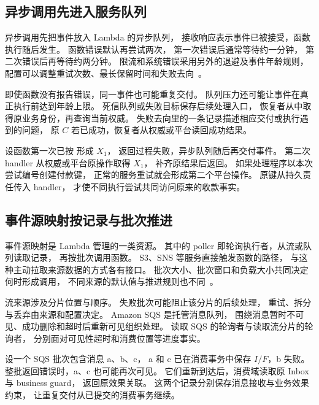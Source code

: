 
\subsection{异步调用先进入服务队列}

异步调用先把事件放入 Lambda 的异步队列，
接收响应表示事件已被接受，函数执行随后发生。
函数错误默认再尝试两次，
第一次错误后通常等待约一分钟，
第二次错误后再等待约两分钟。
限流和系统错误采用另外的退避及事件年龄规则，
配置可以调整重试次数、最长保留时间和失败去向~\cite{lambda-invocation}。

即使函数没有报告错误，同一事件也可能重复交付。
队列压力还可能让事件在真正执行前达到年龄上限。
死信队列或失败目标保存后续处理入口，
恢复者从中取得原业务身份，再查询当前权威。
失败去向里的一条记录描述相应交付或执行遇到的问题，
原 $C$ 若已成功，恢复者从权威或平台读回成功结果。

设函数第一次已按  形成 $X_1$，
返回过程失败，异步队列随后再交付事件。
第二次 handler 从权威或平台原操作取得 $X_1$，
补齐原结果后返回。
如果处理程序以本次尝试编号创建付款键，
正常的服务重试就会形成第二个平台操作。
原键从持久责任传入 handler，
才使不同执行尝试共同访问原来的收款事实。

\subsection{事件源映射按记录与批次推进}

事件源映射是 Lambda 管理的一类资源。
其中的 poller 即轮询执行者，从流或队列读取记录，
再按批次调用函数。
S3、SNS 等服务直接触发函数的路径，
与这种主动拉取来源数据的方式各有接口。
批次大小、批次窗口和负载大小共同决定何时形成调用，
不同来源的默认值与推进规则也不同~\cite{lambda-event-source}。

流来源涉及分片位置与顺序。
失败批次可能阻止该分片的后续处理，
重试、拆分与丢弃由来源和配置决定。
Amazon SQS 是托管消息队列，
围绕消息暂时不可见、成功删除和超时后重新可见组织处理。
读取 SQS 的轮询者与读取流分片的轮询者，
分别面对可见性超时和消费位置等进度事实。

设一个 SQS 批次包含消息 a、b、c，
a 和 c 已在消费事务中保存 $I/F$，b 失败。
整批返回错误时，a、c 也可能再次可见。
它们重新到达后，消费域读取原 Inbox 与 business guard，
返回原效果关联。
这两个记录分别保存消息接收与业务效果约束，
让重复交付从已提交的消费事务继续。


